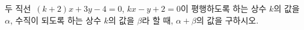 두 직선~$(k+2)x+3y-4=0$, $kx-y+2=0$이 평행하도록 하는 상수 $k$의 값을 $\alpha$, 수직이 되도록 하는 상수 $k$의 값을 $\beta$라 할 때, $\alpha+\beta$의 값을 구하시오. 
